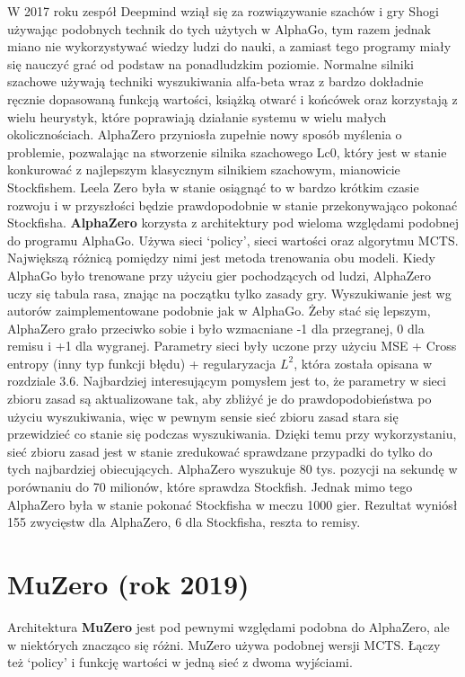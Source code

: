 W 2017 roku zespół Deepmind wziął się za rozwiązywanie szachów i gry Shogi używając podobnych technik do tych użytych w AlphaGo, tym razem jednak miano nie wykorzystywać wiedzy ludzi do nauki, a zamiast tego programy miały się nauczyć grać od podstaw na ponadludzkim poziomie. Normalne silniki szachowe używają techniki wyszukiwania alfa-beta wraz z bardzo dokładnie ręcznie dopasowaną funkcją wartości, książką otwarć i końcówek oraz korzystają z wielu heurystyk, które poprawiają działanie systemu w wielu małych okolicznościach. AlphaZero przyniosła zupełnie nowy sposób myślenia o problemie, pozwalając na stworzenie silnika szachowego Lc0, który jest w stanie konkurować z najlepszym klasycznym silnikiem szachowym, mianowicie Stockfishem. Leela Zero była w stanie osiągnąć to w bardzo krótkim czasie rozwoju i w przyszłości będzie prawdopodobnie w stanie przekonywająco pokonać Stockfisha. \textbf{AlphaZero} korzysta z architektury pod wieloma względami podobnej do programu AlphaGo. Używa sieci ‘policy’, sieci wartości oraz algorytmu MCTS. Największą różnicą pomiędzy nimi jest metoda trenowania obu modeli. Kiedy AlphaGo było trenowane przy użyciu gier pochodzących od ludzi, AlphaZero uczy się tabula rasa, znając na początku tylko zasady gry. Wyszukiwanie jest wg autorów zaimplementowane podobnie jak w AlphaGo. Żeby stać się lepszym, AlphaZero grało przeciwko sobie i było wzmacniane -1 dla przegranej, 0 dla remisu i +1 dla wygranej. Parametry sieci były uczone przy użyciu MSE + Cross entropy (inny typ funkcji błędu) + regularyzacja $L^2$, która została opisana w rozdziale 3.6. Najbardziej interesującym pomysłem jest to, że parametry w sieci zbioru zasad są aktualizowane tak, aby zbliżyć je do prawdopodobieństwa po użyciu wyszukiwania, więc w pewnym sensie sieć zbioru zasad stara się przewidzieć co stanie się podczas wyszukiwania. Dzięki temu przy wykorzystaniu, sieć zbioru zasad jest w stanie zredukować sprawdzane przypadki do tylko do tych najbardziej obiecujących. AlphaZero wyszukuje 80 tys. pozycji na sekundę w porównaniu do 70 milionów, które sprawdza Stockfish. Jednak mimo tego AlphaZero była w stanie pokonać Stockfisha w meczu 1000 gier. Rezultat wyniósł 155 zwycięstw dla AlphaZero, 6 dla Stockfisha, reszta to remisy.

\section{MuZero (rok 2019)}

Architektura \textbf{MuZero} jest pod pewnymi względami podobna do AlphaZero, ale w niektórych znacząco się różni. MuZero używa podobnej wersji MCTS. Łączy też ‘policy’ i funkcję wartości w jedną sieć z dwoma wyjściami.

